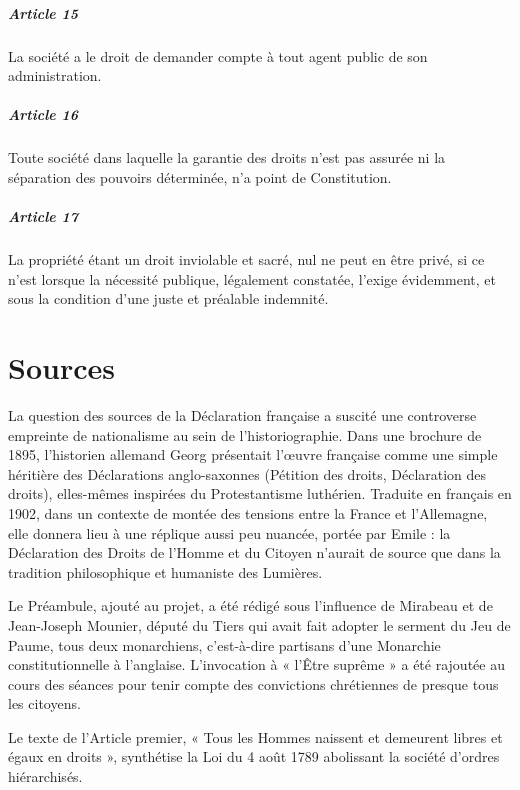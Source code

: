 \documentclass[a4paper,10pt]{book}
\begin{document}
\paragraph{Article 15}
La société a le droit de demander compte à tout agent public de son administration.
\paragraph{Article 16}
Toute société dans laquelle la garantie des droits n'est pas assurée ni la séparation
des pouvoirs déterminée, n'a point de Constitution.
\paragraph{Article 17}
La propriété étant un droit inviolable et sacré, nul ne peut en être privé, 
si ce n'est lorsque la nécessité publique, légalement constatée, 
l'exige évidemment, et sous la condition d'une juste et préalable indemnité.

\chapter{Sources}
La question des sources de la Déclaration française a suscité une controverse 
empreinte de nationalisme au sein de l'historiographie. Dans une brochure de 1895, 
l'historien allemand Georg  présentait l'œuvre française comme une simple 
héritière des Déclarations anglo-saxonnes (Pétition des droits, 
Déclaration des droits), elles-mêmes inspirées du Protestantisme luthérien. 
Traduite en français en 1902, dans un contexte de montée des tensions entre la 
France et l'Allemagne, elle donnera lieu à une réplique aussi peu nuancée, portée 
par Emile  : la Déclaration des Droits de l'Homme et du Citoyen n'aurait de 
source que dans la tradition philosophique et humaniste des Lumières.

Le Préambule, ajouté au projet, a été rédigé sous l'influence de Mirabeau et de 
Jean-Joseph Mounier, député du Tiers qui avait fait adopter le serment du Jeu de Paume, tous deux monarchiens, c'est-à-dire partisans d'une Monarchie constitutionnelle à l'anglaise.
L'invocation à « l'Être suprême » a été rajoutée au cours des séances pour tenir compte des convictions chrétiennes de presque tous les citoyens.

Le texte de l'Article premier, « Tous les Hommes naissent et demeurent libres et égaux en droits », synthétise la Loi du 4 août 1789 abolissant la société d'ordres hiérarchisés.
\end{document}
